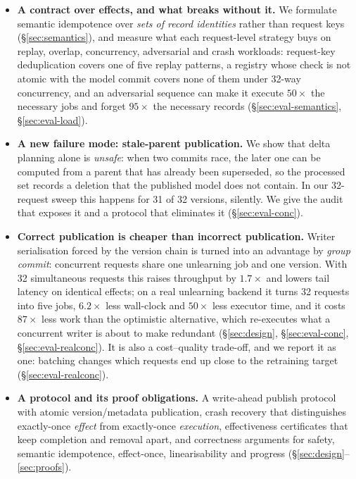 \documentclass[conference]{IEEEtran}
\begin{document}
\begin{itemize}
\item \textbf{A contract over effects, and what breaks without it.}
We formulate semantic idempotence over \emph{sets of record identities} rather than
request keys (\S\ref{sec:semantics}), and measure what each request-level strategy buys on
replay, overlap, concurrency, adversarial and crash workloads: request-key deduplication
covers one of five replay patterns, a registry whose check is not atomic with the model
commit covers none of them under 32-way concurrency, and an adversarial sequence can make
it execute $50\times$ the necessary jobs and forget $95\times$ the necessary records
(\S\ref{sec:eval-semantics}, \S\ref{sec:eval-load}).
\item \textbf{A new failure mode: stale-parent publication.}
We show that delta planning alone is \emph{unsafe}: when two commits race, the
later one can be computed from a parent that has already been superseded, so the
processed set records a deletion that the published model does not contain.  In our
32-request sweep this happens for 31 of 32 versions, silently.  We give the audit
that exposes it and a protocol that eliminates it (\S\ref{sec:eval-conc}).
\item \textbf{Correct publication is cheaper than incorrect publication.}
Writer serialisation forced by the version chain is turned into an advantage by
\emph{group commit}: concurrent requests share one unlearning job and one version.
With 32 simultaneous requests this raises throughput by $1.7\times$ and lowers tail
latency on identical effects; on a real unlearning backend it turns 32 requests into
five jobs, $6.2\times$ less wall-clock and $50\times$ less executor time, and it costs
$87\times$ less work than the optimistic alternative, which re-executes what a
concurrent writer is about to make redundant (\S\ref{sec:design},
\S\ref{sec:eval-conc}, \S\ref{sec:eval-realconc}).  It is also a cost--quality trade-off,
and we report it as one: batching changes which requests end up close to the retraining
target (\S\ref{sec:eval-realconc}).
\item \textbf{A protocol and its proof obligations.}
A write-ahead publish protocol with atomic version/metadata publication, crash
recovery that distinguishes exactly-once \emph{effect} from exactly-once
\emph{execution}, effectiveness certificates that keep completion and removal apart,
and correctness arguments for safety, semantic idempotence, effect-once,
linearisability and progress (\S\ref{sec:design}--\ref{sec:proofs}).

\end{itemize}
\end{document}
